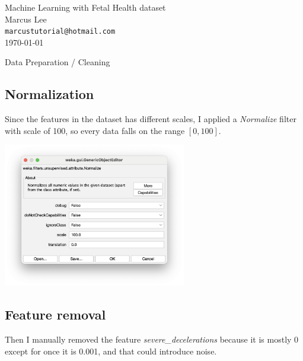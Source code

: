 \documentclass[12pt]{article}
\begin{document}
\begin{center}
    {\LARGE Machine Learning with Fetal Health dataset} \\[0.6cm]

    Marcus Lee \\
    \texttt{\small marcustutorial@hotmail.com} \\[0.3cm]

    \small \today
\end{center}

\begin{section}{Data Preparation / Cleaning}

 \subsection{Normalization}
 Since the features in the dataset has different scales, I applied a
 \textit{Normalize} filter with scale of 100, so every data falls on the
 range $[0, 100]$.

 \begin{center}
     \includegraphics[width=8cm]{images/1_1_normalisation.png}
 \end{center}

 \subsection{Feature removal}
 Then I manually removed the feature \textit{severe\_decelerations} because
 it is mostly 0 except for once it is 0.001, and that could introduce noise.
\end{section}
\end{document}
